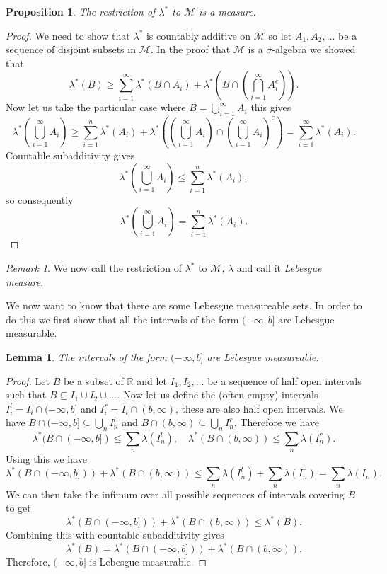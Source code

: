 \documentclass[11pt]{article}
\newtheorem{lem}[thm]{Lemma}
\newtheorem{prp}[thm]{Proposition}
\theoremstyle{definition}
\theoremstyle{remark}
\newtheorem{remark}[thm]{Remark}
\begin{document}
\begin{prp}
The restriction of $\lambda^*$ to $\mathscr{M}$ is a measure. 
\end{prp}
\begin{proof}
We need to show that $\lambda^*$ is countably additive on $\mathscr{M}$ so let $A_1, A_2, \dots$ be a sequence of disjoint subsets in $\mathscr{M}$. In the proof that $\mathscr{M}$ is a $\sigma$-algebra we showed that 
\[ \lambda^*(B) \geq \sum_{i=1}^\infty \lambda^*(B \cap A_i) + \lambda^* \left( B \cap \left( \bigcap_{i=1}^\infty A_i^c \right) \right).  \] Now let us take the particular case where $B = \bigcup_{i=1}^\infty A_i$ this gives
\[ \lambda^* \left( \bigcup_{i=1}^\infty A_i \right) \geq \sum_{i=1}^n \lambda^*(A_i) + \lambda^* \left(\left( \bigcup_{i=1}^\infty A_i \right) \cap \left( \bigcup_{i=1}^\infty A_i \right)^c \right) = \sum_{i=1}^\infty \lambda^* (A_i). \] Countable subadditivity gives
\[ \lambda^* \left( \bigcup_{i=1}^\infty A_i \right) \leq \sum_{i=1}^n \lambda^*(A_i),  \] so consequently
\[ \lambda^* \left( \bigcup_{i=1}^\infty A_i \right) = \sum_{i=1}^n \lambda^*(A_i).  \]
\end{proof}

\begin{remark}
We now call the restriction of $\lambda^*$ to $\mathscr{M}$, $\lambda$ and call it \emph{Lebesgue measure}.
\end{remark}

We now want to know that there are some Lebesgue measureable sets. In order to do this we first show that all the intervals of the form $(-\infty, b]$ are Lebesgue measurable.

\begin{lem}
The intervals of the form $(-\infty, b]$ are Lebesgue measureable.
\end{lem}
\begin{proof}
Let $B$ be a subset of $\mathbb{R}$ and let $I_1, I_2, \dots$ be a sequence of half open intervals such that $B \subseteq I_1 \cup I_2 \cup \dots$. Now let us define the (often empty) intervals $I^l_i = I_i \cap (-\infty, b]$ and $I^r_i = I_i \cap (b, \infty)$, these are also half open intervals. We have $B \cap (-\infty,b] \subseteq \bigcup_n I^l_n$ and $B \cap (b,\infty) \subseteq \bigcup_n I^r_n$. Therefore we have
\[ \lambda^*(B \cap (-\infty, b]) \leq \sum_n \lambda(I^l_n), \quad \lambda^*(B \cap (b,\infty)) \leq \sum_n \lambda(I^r_n). \] Using this we have
\[ \lambda^*(B \cap(-\infty,b])) + \lambda^*(B \cap (b,\infty)) \leq \sum_n \lambda(I^l_n) + \sum_n \lambda(I^r_n) = \sum_n \lambda(I_n).\] We can then take the infimum over all possible sequences of intervals covering $B$ to get
\[ \lambda^*(B \cap(-\infty,b])) + \lambda^*(B \cap (b,\infty)) \leq \lambda^*(B). \] Combining this with countable subadditivity gives
\[ \lambda^*(B) = \lambda^*(B \cap(-\infty,b])) + \lambda^*(B \cap (b,\infty)). \] Therefore, $(-\infty,b]$ is Lebesgue measurable.
\end{proof}
\end{document}
